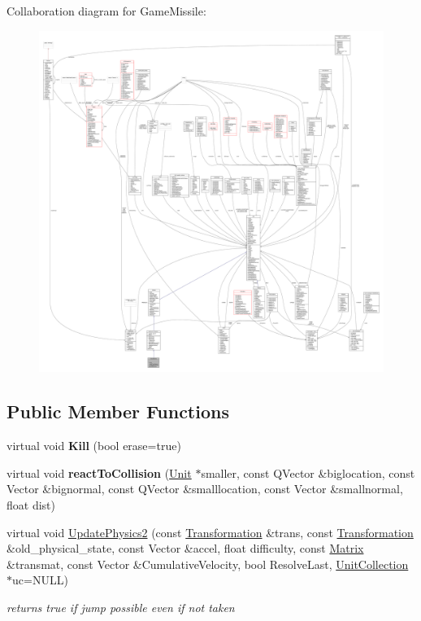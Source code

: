 Collaboration diagram for Game\+Missile\+:
\nopagebreak
\begin{figure}[H]
\begin{center}
\leavevmode
\includegraphics[width=350pt]{df/d39/classGameMissile__coll__graph}
\end{center}
\end{figure}
\subsection*{Public Member Functions}
\begin{DoxyCompactItemize}
\item 
virtual void {\bfseries Kill} (bool erase=true)\hypertarget{classGameMissile_a02ce1416ddd29cc36ec9cbd672f3541d}{}\label{classGameMissile_a02ce1416ddd29cc36ec9cbd672f3541d}

\item 
virtual void {\bfseries react\+To\+Collision} (\hyperlink{classUnit}{Unit} $\ast$smaller, const Q\+Vector \&biglocation, const Vector \&bignormal, const Q\+Vector \&smalllocation, const Vector \&smallnormal, float dist)\hypertarget{classGameMissile_a54a00b8215afbad1e185ef6c1088d35e}{}\label{classGameMissile_a54a00b8215afbad1e185ef6c1088d35e}

\item 
virtual void \hyperlink{classGameMissile_ab82fd3b8a814694c8df124d637bc9a45}{Update\+Physics2} (const \hyperlink{structTransformation}{Transformation} \&trans, const \hyperlink{structTransformation}{Transformation} \&old\+\_\+physical\+\_\+state, const Vector \&accel, float difficulty, const \hyperlink{classMatrix}{Matrix} \&transmat, const Vector \&Cumulative\+Velocity, bool Resolve\+Last, \hyperlink{classUnitCollection}{Unit\+Collection} $\ast$uc=N\+U\+LL)
\begin{DoxyCompactList}\small\item\em returns true if jump possible even if not taken \end{DoxyCompactList}\end{DoxyCompactItemize}
